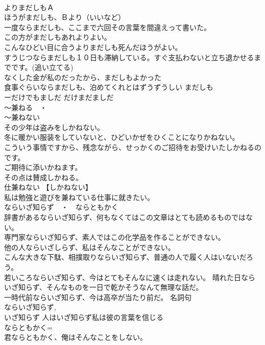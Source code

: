 \documentclass[8pt]{extreport}
\begin{document}
\begin{CJK}{UTF8}{min}
\\	よりまだしもＡ 
\\	ほうがまだしも、Ｂより（いいなど）	
\\	一度ならまだしも、ここまで六回その言葉を間違えって書いた。 
\\	この方がまだしもあれよりよい。
\\	こんなひどい目に合うよりまだしも死んだほうがよい。 
\\	すうじつならまだしも１０日も滞納している。すぐ支払わないと立ち退かせるまでです。(追い立てる) 
\\	なくした金が私のだったから、まだしもよかった 
\\	食事ぐらいならまだしも、泊めてくれとはずうずうしい	まだしも
\\	ーだけでもましだ だけまだましだ
\\	～兼ねる　・　
\\	～兼ねない 
\\	その少年は盗みをしかねない。 
\\	冬に暖かい服装をしていないと、ひどいかぜをひくことになりかねない。 
\\	こういう事情ですから、残念ながら、せっかくのご招待をお受けいたしかねるのです。 
\\	ご期待に添いかねます。 
\\	その点は賛成しかねる。 
\\	仕兼ねない 【しかねない】 
\\	私は勉強と遊びを兼ねている仕事に就きたい。 
\\	ならいざ知らず　・　ならともかく 
\\	辞書があるならいざ知らず、何もなくてはこの文章はとても読めるものではない。 
\\	専門家ならいざ知らず、素人ではこの化学品を作ることができない。 
\\	他の人ならいざしらず、私はそんなことができない。 
\\	こんな大きな下駄、相撲取りならいざ知らず、普通の人で履く人はいないだろう。 
\\	若いころならいざ知らず、今はとてもそんなに速くは走れない。 晴れた日ならいざ知らず、そんなものを一日で乾かそうなんて無理な話だ。
\\	一時代前ならいざ知らず、今は高卒が当たり前だ。	名詞句 
\\	ならいざ知らず, 
\\	いざ知らず 人はいざ知らず私は彼の言葉を信じる　
\\	ならともかく= 
\\	君ならともかく、俺はそんなことをしない。 

\end{CJK}
\end{document}
